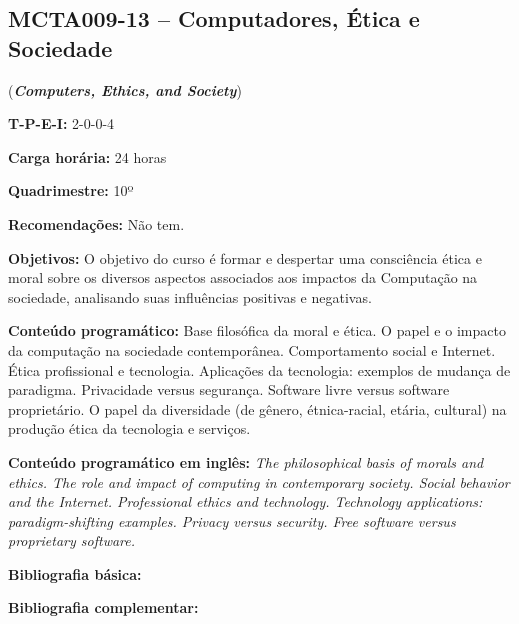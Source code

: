 \documentclass[class=article, crop=false]{standalone}
\begin{document}
\subsection*{MCTA009-13 -- Computadores, Ética e Sociedade}
\label{disc:ces}

(\textbf{\textit{Computers, Ethics, and Society}})

\begin{center}
    \begin{minipage}{0.85\textwidth}
        \textbf{T-P-E-I:} 2-0-0-4
        
        \textbf{Carga horária:} 24 horas
        
        \textbf{Quadrimestre:} 10º
        
        \textbf{Recomendações:} Não tem.
    \end{minipage}
\end{center}

\textbf{Objetivos:}
O objetivo do curso é formar e despertar uma consciência ética e moral sobre os
diversos aspectos associados aos impactos da Computação na sociedade,
analisando suas influências positivas e negativas.

\textbf{Conteúdo programático:}
Base filosófica da moral e ética.
O papel e o impacto da computação na sociedade contemporânea.
Comportamento social e Internet.
Ética profissional e tecnologia.
Aplicações da tecnologia: exemplos de mudança de paradigma.
Privacidade versus segurança.
Software livre versus software proprietário.
O papel da diversidade (de gênero, étnica-racial, etária, cultural) na produção ética da tecnologia e serviços.

\textbf{Conteúdo programático em inglês:}
\textit{The philosophical basis of morals and ethics.
The role and impact of computing in contemporary society. 
Social behavior and the Internet. 
Professional ethics and technology. 
Technology applications: paradigm-shifting examples. 
Privacy versus security. 
Free software versus proprietary software.}

\newrefsection
\textbf{Bibliografia básica:}
\nocite{2017-vazquez, 2020-maciel-viterboa, 2020-maciel-viterbob,2020-maciel-viterboc} 
\printbibliography

\newrefsection
\textbf{Bibliografia complementar:}
\nocite{2011-dupas, 2008-masiero, 2004-lessig, 2010-levy}
\printbibliography
\end{document}
